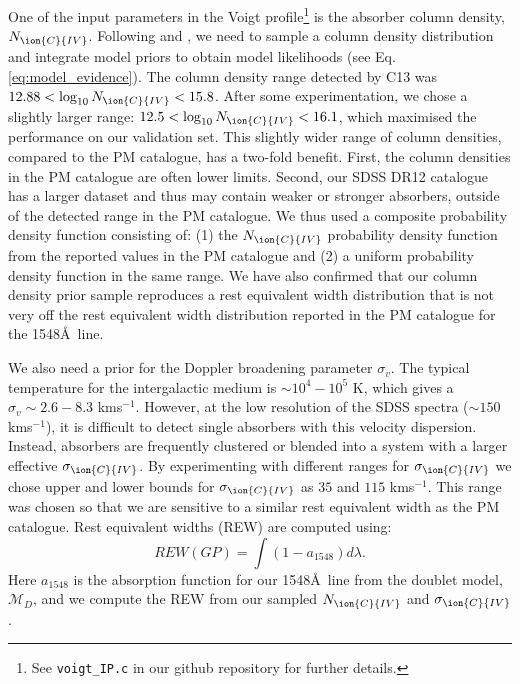 \documentclass[fleqn,usenatbib]{mnras}
\newcommand{\civ}{\ion{C}{IV}}
\newcommand{\nciv}{N_{\civ}} %
\newcommand{\sciv}{\sigma_{\civ}}
\newcommand{\kms}{kms$^{-1}$} %
\newcommand{\model}{\mathcal{M}}
\begin{document}
  One of the input parameters in the Voigt profile\footnote{
  See \texttt{voigt\_IP.c} in our github repository for further details.}
  is the absorber column
  density, $N_{\civ}$.
  Following \cite{romanDLA} and \cite{mfDLA}, we need to sample a column density distribution and integrate model priors to obtain model likelihoods (see Eq. \ref{eq:model_evidence}).
The column density range detected by C13 was $12.88< \log_{10} \nciv <15.8$. After some experimentation, we chose a slightly larger range: $12.5 < \log_{10} \nciv < 16.1$, which maximised the performance on our validation set. This slightly wider range of column densities, compared to the PM catalogue, has a two-fold benefit. First, the column densities in the PM catalogue are often lower limits. Second, our SDSS DR12 catalogue has a larger dataset and thus may contain weaker or stronger absorbers, outside of the detected range in the PM catalogue. We thus used a composite probability density function consisting of:
    (1) the $\nciv$ probability density function from the reported values in the PM catalogue  and
    (2) a uniform probability density function in the same range.
  We have also confirmed that our column density prior sample reproduces a rest equivalent width distribution that is not very off the rest equivalent width distribution reported in the PM catalogue for the 1548\AA\ line.

We also need a prior for the Doppler broadening parameter $\sigma_v$.
The typical temperature for the intergalactic medium is $\sim 10^4-10^5$
K, which gives a $\sigma_v \sim 2.6 - 8.3$ \kms.
However, at the low resolution of the SDSS spectra ($\sim 150$ \kms), it is difficult to detect single absorbers with this velocity dispersion. Instead, absorbers are frequently clustered or blended into a system with a larger effective
$\sciv$. By experimenting with different ranges for $\sciv$
we chose upper and lower bounds for $\sciv$ as $35$ and $115$ \kms. This range was chosen so that we are sensitive to a similar rest equivalent width as the PM catalogue. Rest equivalent widths (REW) are computed using:
\begin{equation}
  REW(GP) =  \int (1 - a_{1548})d\lambda.
  \label{eq:rewgp} %
\end{equation}
Here $a_{1548}$ is the absorption function for our 1548\AA\ line from the doublet model, $\model_D$, and we compute the REW from our sampled $\nciv$ and $\sciv$.
\end{document}
